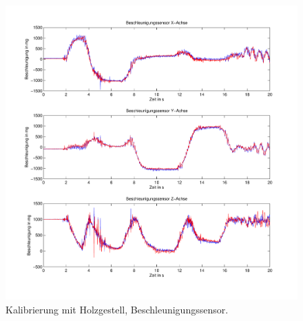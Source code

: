 \begin{figure}
	\centering
	\includegraphics[width=1\textwidth]{images/Messergebnisse/calibration-wood-accel}
	\caption{Kalibrierung mit Holzgestell, Beschleunigungssensor.}
\end{figure}










